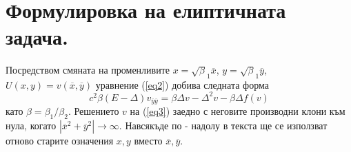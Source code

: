 \documentclass{article}
\newcommand{\rf}[1]{(\ref{#1})}
\begin{document}
\section{Формулировка на елиптичната задача.}
Посредством смяната на променливите $x=\sqrt\beta_1 { \overline x}$, $y=\sqrt\beta_1 { \overline y}$, $U(x,y)= v({ \overline x},{ \overline y} )$ уравнение 
\rf{eq2} добива следната форма
 \begin{equation}\label{eq3}
c^2 \beta (E- \Delta) v_{{\overline y}{\overline y}} = \beta \Delta v - \Delta^2 v - \beta \Delta f(v)
\end{equation}
като $\beta = \beta_1 / \beta_2$.
Решението $v$ на \rf{eq3} заедно с неговите производни клони към нула, когато $|{\overline x}^2 +{\overline y}^2|\rightarrow \infty$.
Навсякъде по - надолу в текста ще се използват отново старите означения $x,y$ вместо ${\overline x},{\overline y}$.
\end{document}
